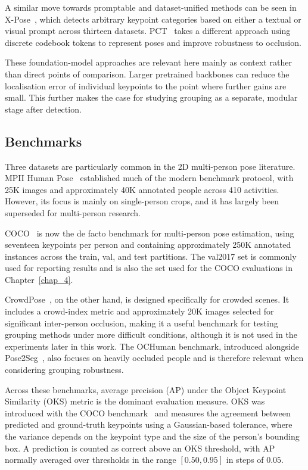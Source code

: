 A similar move towards promptable and dataset-unified methods can be seen in X-Pose~\cite{yang2024xpose},
which detects arbitrary keypoint categories based on either a textual or visual prompt
across thirteen datasets.
PCT~\cite{geng2023pct} takes a different approach
using discrete codebook tokens to represent poses and improve robustness to occlusion.

These foundation-model approaches are relevant here mainly as context rather than direct points of comparison.
Larger pretrained backbones can reduce the localisation error of individual keypoints
to the point where further gains are small.
This further makes the case for studying grouping as a separate, modular stage after detection.

\subsection{Benchmarks}
\label{sec_lit_hpe_benchmarks}

Three datasets are particularly common in the 2D multi-person pose literature.
MPII Human Pose~\cite{andriluka2014mpii} established much of the modern benchmark protocol,
with 25K images and approximately 40K annotated people across 410 activities.
However, its focus is mainly on single-person crops,
and it has largely been superseded for multi-person research.

COCO~\cite{lin2014coco} is now the de facto benchmark for multi-person pose estimation,
using seventeen keypoints per person
and containing approximately 250K annotated instances across the train, val, and test partitions.
The val2017 set is commonly used for reporting results
and is also the set used for the COCO evaluations in Chapter~\ref{chap_4}.

CrowdPose~\cite{li2019crowdpose}, on the other hand, is designed specifically for crowded scenes.
It includes a crowd-index metric and approximately 20K images selected for significant inter-person occlusion,
making it a useful benchmark for testing grouping methods under more difficult conditions,
although it is not used in the experiments later in this work.
The OCHuman benchmark, introduced alongside Pose2Seg~\cite{zhang2019pose2seg},
also focuses on heavily occluded people and is therefore relevant when considering grouping robustness.

Across these benchmarks,
average precision (AP) under the Object Keypoint Similarity (OKS) metric is the dominant evaluation measure.
OKS was introduced with the COCO benchmark~\cite{lin2014coco}
and measures the agreement between predicted and ground-truth keypoints using a Gaussian-based tolerance,
where the variance depends on the keypoint type and the size of the person's bounding box.
A prediction is counted as correct above an OKS threshold,
with AP normally averaged over thresholds in the range $[0.50, 0.95]$ in steps of $0.05$.

